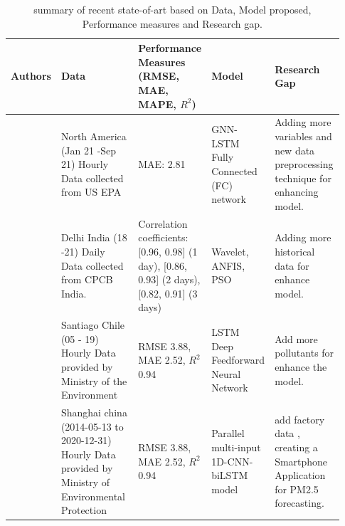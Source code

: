 \documentclass[a4paper, fleqn]{cas-sc}
\theoremstyle{definition}
\theoremstyle{remark}
\begin{document}
\begin{landscape}
  \setlength{\tabcolsep}{3pt}

  {\renewcommand{\arraystretch}{1}%
  \begin{longtable}[h!]{ p{0.12\linewidth} p{0.27\linewidth} p{0.16\linewidth} p{0.16\linewidth} p{0.22\linewidth} }%
  \caption{summary of recent state-of-art based on Data,  Model proposed,  Performance measures and Research gap.}
  \label{t_lr}\\
  \hline
  Authors                    & Data                                                                                                     & Performance Measures (RMSE,  MAE, MAPE,  $R^2$)                                                                    & Model                                                               & Research Gap                                                       \\ \hline
  \endhead
  \hline
  \endfoot
  \endlastfoot
  \cite{li2023nested}                & North America (Jan 21 -Sep 21)   Hourly Data collected from US EPA                                       & MAE:  2.81                                                                                               & GNN-LSTM Fully Connected (FC) network                              & Adding more variables and new data preprocessing technique for enhancing model.                                    \\
  \cite{pruthi2022low}           & Delhi  India (18 -21) Daily Data collected from   CPCB India.                                            & Correlation coefficients:  {[}0.96, 0.98{]} (1   day),  {[}0.86, 0.93{]} (2 days),  {[}0.82, 0.91{]} (3 days) & Wavelet,  ANFIS,  PSO                                                 &  Adding more historical data for enhance model.                                                  \\
  \cite{menares2021forecasting}             & Santiago Chile (05 - 19) Hourly   Data provided by Ministry of the Environment                           & RMSE 3.88,  MAE 2.52,  $R^2$ 0.94                                                                            & LSTM Deep Feedforward Neural Network                               & Add more pollutants for enhance the model.               \\
 \cite{zhu2023investigation}            & Shanghai china (2014-05-13 to 2020-12-31)   Hourly Data provided by Ministry of Environmental Protection & RMSE 3.88,  MAE 2.52,  $R^2$ 0.94                                                                            & Parallel multi-input 1D-CNN-biLSTM   model                          & add  factory data ,  creating a Smartphone Application for PM2.5 forecasting.                                                         \\




\end{longtable}}
\end{landscape}
\end{document}
